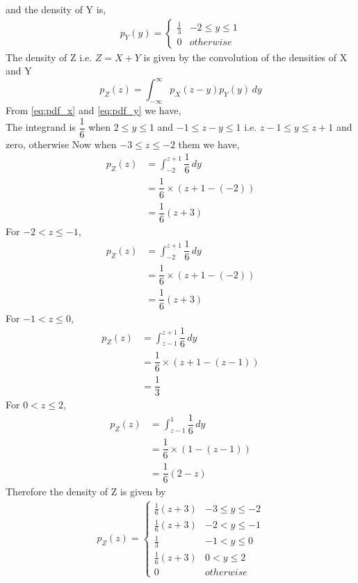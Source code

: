 \documentclass[journal,12pt,twocolumn]{IEEEtran}
\begin{document}
and the density of Y is,
\begin{align}
\label{eq:pdf_y}
p_{Y}(y)  = 
\begin{cases}
\frac{1}{3} & -2 \le y \le 1
\\
0 & otherwise
\end{cases}
\end{align}
The density of Z i.e. $Z= X + Y $ is given by the convolution of the densities of X and Y
\begin{equation}
    p_Z(z) =  \int_{- \infty}^{\infty} p_X(z-y)p_Y(y) \,dy 
\end{equation}
From \ref{eq:pdf_x} and \ref{eq:pdf_y} we have, \\
The integrand is $\dfrac{1}{6}$ when $2 \le y \le 1$ and  $-1 \le z-y \le 1 $ i.e. $ z-1 \le y \le z+1$  and zero, otherwise
Now when $-3 \le z \le -2$ them we have, 
\begin{align}
    p_Z(z) &=   \int_{-2}^{z+1} \dfrac{1}{6} \,dy  \\
          &= \dfrac{1}{6} \times ( z+1 - (-2)) \\
          &= \dfrac{1}{6}(z+3)
\end{align}
For $ -2 < z \le -1 $,
\begin{align}
    p_Z(z) &=   \int_{-2}^{z+1} \dfrac{1}{6} \,dy  \\
          &= \dfrac{1}{6} \times ( z+1 - (-2)) \\
          &= \dfrac{1}{6}(z+3)
\end{align}
For $ -1 < z \le 0 $,
\begin{align}
    p_Z(z) &=   \int_{z-1}^{z+1} \dfrac{1}{6} \,dy  \\
          &= \dfrac{1}{6} \times ( z+1 - (z-1)) \\
          &= \dfrac{1}{3}
\end{align}
For $ 0 < z \le 2$,
\begin{align}
    p_Z(z) &=   \int_{z-1}^{1} \dfrac{1}{6} \,dy  \\
          &= \dfrac{1}{6} \times ( 1- (z-1)) \\
          &= \dfrac{1}{6}(2-z)
\end{align}
Therefore the density of Z is given by
\begin{align}
\label{eq:pdf_z}
p_{Z}(z)  = 
\begin{cases}
\frac{1}{6}(z+3) & -3 \le y \le -2
\\
\frac{1}{6}(z+3) & -2 < y \le -1
\\
\frac{1}{3} & -1 < y \le 0
\\
\frac{1}{6}(z+3) & 0 < y \le 2
\\
0 & otherwise
\end{cases}
\end{align}
\end{document}
